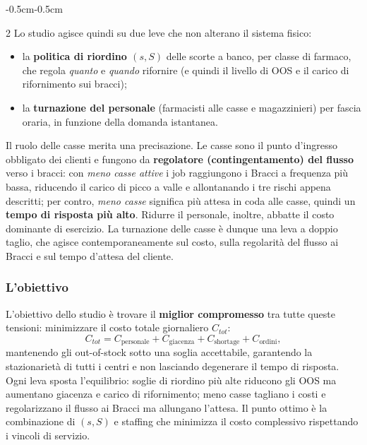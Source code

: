 \documentclass{article}
\begin{document}
\begin{adjustwidth}{-0.5cm}{-0.5cm}
\begin{multicols}{2}
Lo studio agisce quindi su due leve che non alterano il sistema fisico:
\begin{itemize}
    \item[\ding{112}] la \textbf{politica di riordino $(s,S)$} delle scorte a banco, per classe di
    farmaco, che regola \emph{quanto} e \emph{quando} rifornire (e quindi il livello di OOS e il
    carico di rifornimento sui bracci);
    \item[\ding{112}] la \textbf{turnazione del personale} (farmacisti alle casse e magazzinieri)
    per fascia oraria, in funzione della domanda istantanea.
\end{itemize}
Il ruolo delle casse merita una precisazione. Le casse sono il punto d'ingresso
obbligato dei clienti e fungono da \textbf{regolatore (contingentamento) del flusso} verso i
bracci: con \emph{meno casse attive} i job raggiungono i Bracci a frequenza più bassa, riducendo il carico di picco a valle e allontanando i tre rischi
appena descritti; per contro, \emph{meno casse} significa più attesa in coda alle casse, quindi un
\textbf{tempo di risposta più alto}. Ridurre il personale, inoltre, abbatte il costo dominante di
esercizio. La turnazione delle casse è dunque una leva a doppio taglio, che agisce
contemporaneamente sul costo, sulla regolarità del flusso ai Bracci e sul tempo d'attesa del
cliente.

\subsubsection*{L'obiettivo}
L'obiettivo dello studio è trovare il \textbf{miglior compromesso} tra tutte queste tensioni:
minimizzare il costo totale giornaliero $C_{tot}$: 
\[
C_{tot} = C_{\text{personale}} + C_{\text{giacenza}} + C_{\text{shortage}} + C_{\text{ordini}},
\]
mantenendo gli out-of-stock sotto una soglia accettabile, garantendo la stazionarietà di tutti i
centri e non lasciando degenerare il tempo di risposta. Ogni leva sposta l'equilibrio: soglie di
riordino più alte riducono gli OOS ma aumentano giacenza e carico di rifornimento; meno casse
tagliano i costi e regolarizzano il flusso ai Bracci ma allungano l'attesa. Il punto ottimo è la
combinazione di $(s,S)$ e staffing che minimizza il costo complessivo rispettando i vincoli di
servizio.

\end{multicols}


\end{adjustwidth}
\end{document}
